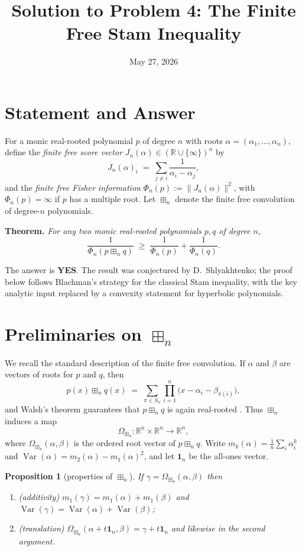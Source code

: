 \documentclass[11pt]{article}
\title{Solution to Problem 4: The Finite Free Stam Inequality}
\author{}
\date{May 27, 2026}
\newcommand{\R}{\mathbb{R}}
\newcommand{\bn}{\boxplus_n}
\newcommand{\score}{J_n}
\newcommand{\Var}{\operatorname{Var}}
\newtheorem{proposition}{Proposition}
\theoremstyle{definition}
\begin{document}
\maketitle

\section*{Statement and Answer}

For a monic real-rooted polynomial $p$ of degree $n$ with roots
$\alpha=(\alpha_1,\dots,\alpha_n)$, define the \emph{finite free score vector}
$\score(\alpha)\in(\R\cup\{\infty\})^n$ by
\[
\score(\alpha)_i \;=\; \sum_{j\ne i}\frac{1}{\alpha_i-\alpha_j},
\]
and the \emph{finite free Fisher information}
$\Phi_n(p):=\|\score(\alpha)\|^2$, with $\Phi_n(p)=\infty$ if $p$ has a
multiple root. Let $\bn$ denote the finite free convolution of degree-$n$
polynomials.

\medskip
\noindent\textbf{Theorem.} \emph{For any two monic real-rooted polynomials
$p,q$ of degree $n$,}
\[
\frac{1}{\Phi_n(p\bn q)}\;\ge\;\frac{1}{\Phi_n(p)}+\frac{1}{\Phi_n(q)}.
\]

\medskip
\noindent The answer is \textbf{YES}. The result was conjectured by
D.~Shlyakhtenko; the proof below follows Blachman's strategy for the classical
Stam inequality, with the key analytic input replaced by a convexity statement
for hyperbolic polynomials.

\section*{Preliminaries on $\bn$}

We recall the standard description of the finite free convolution. If $\alpha$
and $\beta$ are vectors of roots for $p$ and $q$, then
\begin{equation}\label{eq:walsh}
p(x)\bn q(x)\;=\;\sum_{\pi\in S_n}\prod_{i=1}^n\bigl(x-\alpha_i-\beta_{\pi(i)}\bigr),
\end{equation}
and Walsh's theorem guarantees that $p\bn q$ is again real-rooted
\cite{Walsh, MSS22}. Thus $\bn$ induces a map
\[
\Omega_{\bn}:\R^n\times\R^n\to\R^n,
\]
where $\Omega_{\bn}(\alpha,\beta)$ is the ordered root vector of $p\bn q$. Write
$m_k(\alpha)=\frac1n\sum_i\alpha_i^k$ and
$\Var(\alpha)=m_2(\alpha)-m_1(\alpha)^2$, and let $\mathbf 1_n$ be the all-ones
vector.

\begin{proposition}[properties of $\bn$]\label{prop:props}
If $\gamma=\Omega_{\bn}(\alpha,\beta)$ then
\begin{enumerate}\setlength\itemsep{2pt}
\item (additivity) $m_1(\gamma)=m_1(\alpha)+m_1(\beta)$ and
$\Var(\gamma)=\Var(\alpha)+\Var(\beta)$;
\item (translation) $\Omega_{\bn}(\alpha+t\mathbf 1_n,\beta)=\gamma+t\mathbf 1_n$
and likewise in the second argument.
\end{enumerate}
\end{proposition}
\end{document}
